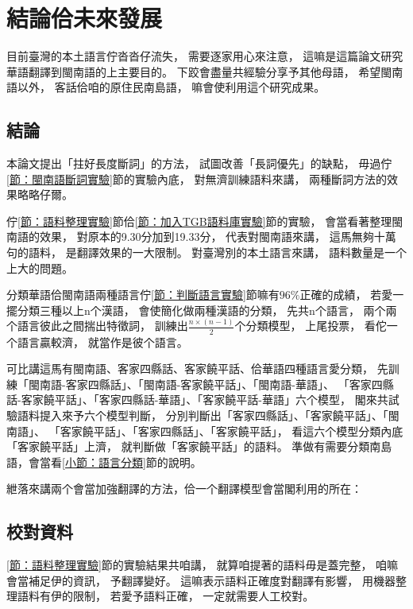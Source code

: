 \chapter{結論佮未來發展}
\label{章：結論佮未來發展}
目前臺灣的本土語言佇沓沓仔流失，
需要逐家用心來注意，
這嘛是這篇論文研究華語翻譯到閩南語的上主要目的。
下跤會盡量共經驗分享予其他母語，
希望閩南語以外，
客話佮咱的原住民南島語，
嘛會使利用這个研究成果。

\section{結論}
\label{節：結論}
本論文提出「拄好長度斷詞」的方法，
試圖改善「長詞優先」的缺點，
毋過佇\ref{節：閩南語斷詞實驗}節的實驗內底，
對無濟訓練語料來講，
兩種斷詞方法的效果略略仔爾。


佇\ref{節：語料整理實驗}節佮\ref{節：加入TGB語料庫實驗}節的實驗，
會當看著整理閩南語的效果，
對原本的9.30分加到19.33分，
代表對閩南語來講，
這馬無夠十萬句的語料，
是翻譯效果的一大限制。
對臺灣別的本土語言來講，
語料數量是一个上大的問題。

分類華語佮閩南語兩種語言佇\ref{節：判斷語言實驗}節嘛有$96\%$正確的成績，
若愛一擺分類三種以上n个漢語，
會使簡化做兩種漢語的分類，
先共n个語言，
兩个兩个語言彼此之間揣出特徵詞，
訓練出$\frac{n\times(n-1)}{2}$个分類模型，
上尾投票，
看佗一个語言贏較濟，
就當作是彼个語言。

可比講這馬有閩南語、客家四縣話、客家饒平話、佮華語四種語言愛分類，
先訓練「閩南語-客家四縣話」、「閩南語-客家饒平話」、「閩南語-華語」、
「客家四縣話-客家饒平話」、「客家四縣話-華語」、「客家饒平話-華語」六个模型，
閣來共試驗語料提入來予六个模型判斷，
分別判斷出「客家四縣話」、「客家饒平話」、「閩南語」、
「客家饒平話」、「客家四縣話」、「客家饒平話」，
看這六个模型分類內底「客家饒平話」上濟，
就判斷做「客家饒平話」的語料。
準做有需要分類南島語，會當看\ref{小節：語言分類}節的說明。

紲落來講兩个會當加強翻譯的方法，佮一个翻譯模型會當閣利用的所在：
\section{校對資料}
\label{節：校對資料}
\ref{節：語料整理實驗}節的實驗結果共咱講，
就算咱提著的語料毋是蓋完整，
咱嘛會當補足伊的資訊，
予翻譯變好。
這嘛表示語料正確度對翻譯有影響，
用機器整理語料有伊的限制，
若愛予語料正確，
一定就需要人工校對。


